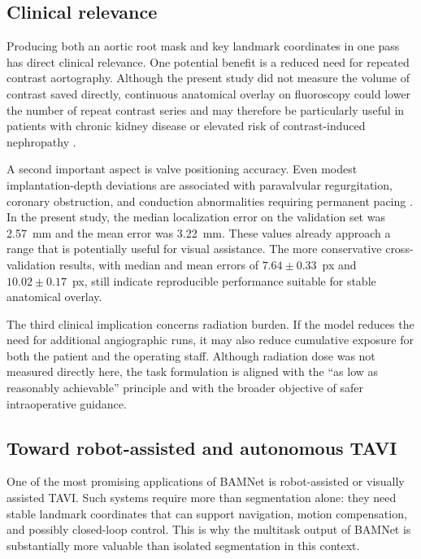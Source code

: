 \documentclass[oneside,pdflatex,sn-mathphys-num]{sn-jnl}
\begin{document}
\subsection{Clinical relevance}\label{subsec:clinical}

Producing both an aortic root mask and key landmark coordinates in one pass has direct clinical relevance. One potential benefit is a reduced need for repeated contrast aortography. Although the present study did not measure the volume of contrast saved directly, continuous anatomical overlay on fluoroscopy could lower the number of repeat contrast series and may therefore be particularly useful in patients with chronic kidney disease or elevated risk of contrast-induced nephropathy \cite{dangas2020_tavi,yamamoto2021_tavi}.

A second important aspect is valve positioning accuracy. Even modest implantation-depth deviations are associated with paravalvular regurgitation, coronary obstruction, and conduction abnormalities requiring permanent pacing \cite{pibarot2021_pvl,jilaihawi2022_coronary,kammler2016_implantdepth}. In the present study, the median localization error on the validation set was 2.57~mm and the mean error was 3.22~mm. These values already approach a range that is potentially useful for visual assistance. The more conservative cross-validation results, with median and mean errors of $7.64 \pm 0.33$~px and $10.02 \pm 0.17$~px, still indicate reproducible performance suitable for stable anatomical overlay.

The third clinical implication concerns radiation burden. If the model reduces the need for additional angiographic runs, it may also reduce cumulative exposure for both the patient and the operating staff. Although radiation dose was not measured directly here, the task formulation is aligned with the ``as low as reasonably achievable'' principle and with the broader objective of safer intraoperative guidance.

\subsection{Toward robot-assisted and autonomous TAVI}\label{subsec:robotic}

One of the most promising applications of BAMNet is robot-assisted or visually assisted TAVI. Such systems require more than segmentation alone: they need stable landmark coordinates that can support navigation, motion compensation, and possibly closed-loop control. This is why the multitask output of BAMNet is substantially more valuable than isolated segmentation in this context.
\end{document}
